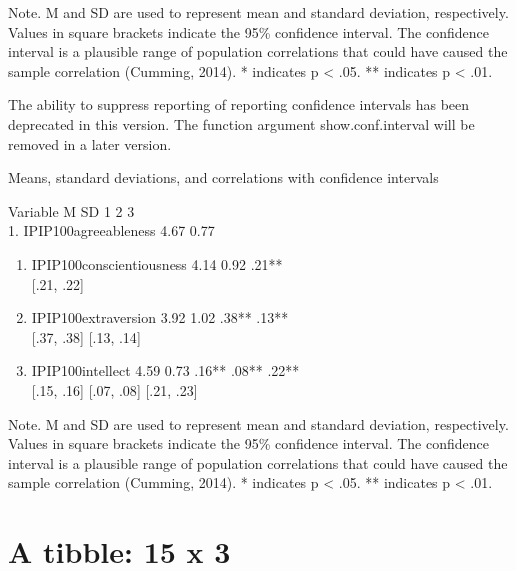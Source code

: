 \documentclass[
  english,
  man]{apa6}
\begin{document}
Note. M and SD are used to represent mean and standard deviation, respectively.
Values in square brackets indicate the 95\% confidence interval.
The confidence interval is a plausible range of population correlations
that could have caused the sample correlation (Cumming, 2014).
* indicates p \textless{} .05. ** indicates p \textless{} .01.

The ability to suppress reporting of reporting confidence intervals has been deprecated in this version.
The function argument show.conf.interval will be removed in a later version.

Means, standard deviations, and correlations with confidence intervals

Variable M SD 1 2 3\\
1. IPIP100agreeableness 4.67 0.77

\begin{enumerate}
\def\labelenumi{\arabic{enumi}.}
\setcounter{enumi}{1}
\item
  IPIP100conscientiousness 4.14 0.92 .21**\\
  {[}.21, .22{]}
\item
  IPIP100extraversion 3.92 1.02 .38** .13**\\
  {[}.37, .38{]} {[}.13, .14{]}
\item
  IPIP100intellect 4.59 0.73 .16** .08** .22**\\
  {[}.15, .16{]} {[}.07, .08{]} {[}.21, .23{]}
\end{enumerate}

Note. M and SD are used to represent mean and standard deviation, respectively.
Values in square brackets indicate the 95\% confidence interval.
The confidence interval is a plausible range of population correlations
that could have caused the sample correlation (Cumming, 2014).
* indicates p \textless{} .05. ** indicates p \textless{} .01.

\hypertarget{a-tibble-15-x-3-1}{%
\section{A tibble: 15 x 3}\label{a-tibble-15-x-3-1}}
\end{document}
